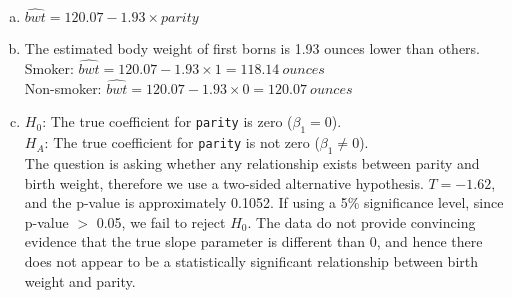 {
\begin{enumerate}[(a)]
\setlength{\itemsep}{0mm}
\item $\widehat{bwt} = 120.07 - 1.93 \times parity $
\item The estimated body weight of first borns is 1.93 ounces lower than others. \\
Smoker: $\widehat{bwt} = 120.07 - 1.93 \times 1 = 118.14~ounces $ \\
Non-smoker: $\widehat{bwt} = 120.07 - 1.93 \times 0 = 120.07 ~ounces $ 
\item $H_0$: The true coefficient for \texttt{parity} is zero ($\beta_1 = 0$). \\
$H_A$: The true coefficient for \texttt{parity} is not zero ($\beta_1 \ne 0$). \\
The question is asking whether any relationship exists
 between parity and birth weight, therefore we use a two-sided alternative hypothesis. $T = -1.62$, and the p-value is approximately 0.1052. If using a 5\% significance level, since p-value $>$ 0.05, we fail to reject $H_0$. The data do not provide convincing evidence that the true slope parameter is different than 0, and hence there does not appear to be a statistically significant relationship between birth weight and parity.
\end{enumerate}
}\label{babiesParity}

